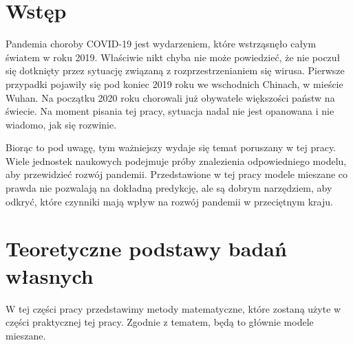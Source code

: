 \documentclass[12pt]{mwbk}
\theoremstyle{plain}
\theoremstyle{definition}
\theoremstyle{remark}
\begin{document}



\tableofcontents


\chapter*{Wstęp}




Pandemia choroby COVID-19 jest wydarzeniem, które wstrząsnęło całym światem w roku 2019. Właściwie nikt chyba nie może powiedzieć, że nie poczuł się dotknięty przez sytuację związaną z rozprzestrzenianiem się wirusa. Pierwsze przypadki pojawiły się pod koniec 2019 roku we wschodnich Chinach, w mieście Wuhan. Na początku 2020 roku chorowali już obywatele większości państw na świecie. Na moment pisania tej pracy, sytuacja nadal nie jest opanowana i nie wiadomo, jak się rozwinie.

Biorąc to pod uwagę, tym ważniejszy wydaje się temat poruszany w tej pracy. Wiele jednostek naukowych podejmuje próby znalezienia odpowiedniego modelu, aby przewidzieć rozwój pandemii. Przedstawione w tej pracy modele mieszane co prawda nie pozwalają na dokładną predykcję, ale są dobrym narzędziem, aby odkryć, które czynniki mają wpływ na rozwój pandemii w przeciętnym kraju.



\begin{center}
\end{center}







\chapter{Teoretyczne podstawy badań własnych}
W tej części pracy przedstawimy metody matematyczne, które zostaną użyte w części praktycznej tej pracy. Zgodnie z tematem, będą to głównie modele mieszane.
\end{document}
